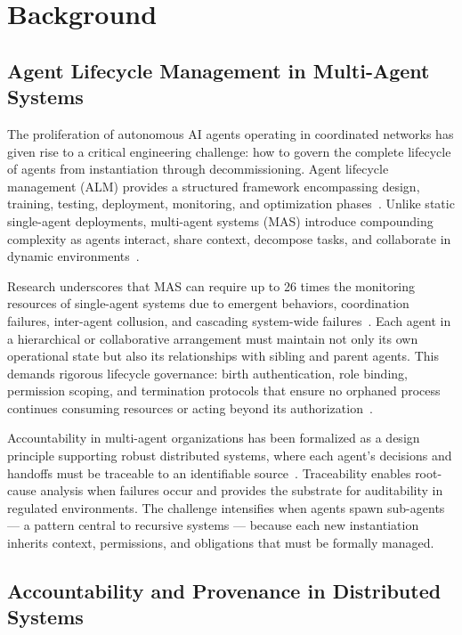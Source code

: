 \section{Background}

\subsection{Agent Lifecycle Management in Multi-Agent Systems}

The proliferation of autonomous AI agents operating in coordinated networks has given rise to a critical engineering challenge: how to govern the complete lifecycle of agents from instantiation through decommissioning. Agent lifecycle management (ALM) provides a structured framework encompassing design, training, testing, deployment, monitoring, and optimization phases~\cite{onereach_alm_2026}. Unlike static single-agent deployments, multi-agent systems (MAS) introduce compounding complexity as agents interact, share context, decompose tasks, and collaborate in dynamic environments~\cite{wu_etal_2022,automationanywhere_mas_2024}.

Research underscores that MAS can require up to 26 times the monitoring resources of single-agent systems due to emergent behaviors, coordination failures, inter-agent collusion, and cascading system-wide failures~\cite{lumenova_mas_governance}. Each agent in a hierarchical or collaborative arrangement must maintain not only its own operational state but also its relationships with sibling and parent agents. This demands rigorous lifecycle governance: birth authentication, role binding, permission scoping, and termination protocols that ensure no orphaned process continues consuming resources or acting beyond its authorization~\cite{saviynt_iam_2025}.

Accountability in multi-agent organizations has been formalized as a design principle supporting robust distributed systems, where each agent's decisions and handoffs must be traceable to an identifiable source~\cite{castellano_accountability_2022}. Traceability enables root-cause analysis when failures occur and provides the substrate for auditability in regulated environments. The challenge intensifies when agents spawn sub-agents — a pattern central to recursive systems — because each new instantiation inherits context, permissions, and obligations that must be formally managed.

\subsection{Accountability and Provenance in Distributed Systems}

